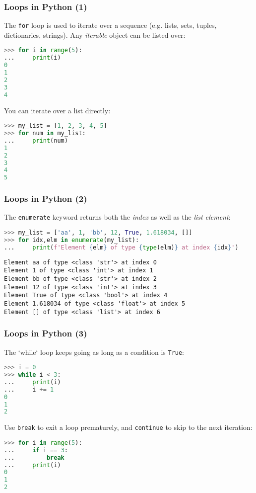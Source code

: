 \begin{frame}[fragile]
  \frametitle{Loops in Python (1)}
  The \lstinline$for$ loop is used to iterate over a sequence (e.g. lists, sets, tuples, dictionaries, strings). Any \emph{iterable} object can be listed over:
  \begin{lstlisting}[language=Python,numbers=none]
>>> for i in range(5):
...     print(i)
0
1
2
3
4
  \end{lstlisting}\pause
  You can iterate over a list directly:
  \begin{lstlisting}[language=Python,numbers=none]
>>> my_list = [1, 2, 3, 4, 5]
>>> for num in my_list:
...     print(num)
1
2
3
4
5
  \end{lstlisting}
\end{frame}

\begin{frame}[fragile]
  \frametitle{Loops in Python (2)}
  The \lstinline|enumerate| keyword returns both the \emph{index} as well as the \emph{list element}:
  \begin{lstlisting}[language=Python,numbers=none]
>>> my_list = ['aa', 1, 'bb', 12, True, 1.618034, []]
>>> for idx,elm in enumerate(my_list):
...     print(f'Element {elm} of type {type(elm)} at index {idx}')
  \end{lstlisting}
  \pause
  \begin{lstlisting}[style=PyOutput]
Element aa of type <class 'str'> at index 0
Element 1 of type <class 'int'> at index 1
Element bb of type <class 'str'> at index 2
Element 12 of type <class 'int'> at index 3
Element True of type <class 'bool'> at index 4
Element 1.618034 of type <class 'float'> at index 5
Element [] of type <class 'list'> at index 6
  \end{lstlisting}
\end{frame}

\begin{frame}[fragile]
  \frametitle{Loops in Python (3)}
  The `while` loop keeps going as long as a condition is \lstinline{True}:
  \begin{lstlisting}[language=Python,numbers=none]
>>> i = 0
>>> while i < 3:
...     print(i)
...     i += 1
0
1
2
  \end{lstlisting}\pause
  Use \lstinline|break| to exit a loop prematurely, and \lstinline|continue| to skip to the next iteration:
  \begin{lstlisting}[language=Python,numbers=none]
>>> for i in range(5):
...     if i == 3:
...         break
...     print(i)
0
1
2
  \end{lstlisting}
\end{frame}

